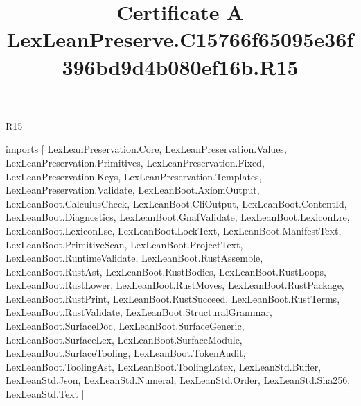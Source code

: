 \begin{lexlean}{R15}
\title{Certificate A LexLeanPreserve.C15766f65095e36f396bd9d4b080ef16b.R15}
\begin{coremodule}
imports [
  LexLeanPreservation.Core,
  LexLeanPreservation.Values,
  LexLeanPreservation.Primitives,
  LexLeanPreservation.Fixed,
  LexLeanPreservation.Keys,
  LexLeanPreservation.Templates,
  LexLeanPreservation.Validate,
  LexLeanBoot.AxiomOutput,
  LexLeanBoot.CalculusCheck,
  LexLeanBoot.CliOutput,
  LexLeanBoot.ContentId,
  LexLeanBoot.Diagnostics,
  LexLeanBoot.GnafValidate,
  LexLeanBoot.LexiconLre,
  LexLeanBoot.LexiconLse,
  LexLeanBoot.LockText,
  LexLeanBoot.ManifestText,
  LexLeanBoot.PrimitiveScan,
  LexLeanBoot.ProjectText,
  LexLeanBoot.RuntimeValidate,
  LexLeanBoot.RustAssemble,
  LexLeanBoot.RustAst,
  LexLeanBoot.RustBodies,
  LexLeanBoot.RustLoops,
  LexLeanBoot.RustLower,
  LexLeanBoot.RustMoves,
  LexLeanBoot.RustPackage,
  LexLeanBoot.RustPrint,
  LexLeanBoot.RustSucceed,
  LexLeanBoot.RustTerms,
  LexLeanBoot.RustValidate,
  LexLeanBoot.StructuralGrammar,
  LexLeanBoot.SurfaceDoc,
  LexLeanBoot.SurfaceGeneric,
  LexLeanBoot.SurfaceLex,
  LexLeanBoot.SurfaceModule,
  LexLeanBoot.SurfaceTooling,
  LexLeanBoot.TokenAudit,
  LexLeanBoot.ToolingAst,
  LexLeanBoot.ToolingLatex,
  LexLeanStd.Buffer,
  LexLeanStd.Json,
  LexLeanStd.Numeral,
  LexLeanStd.Order,
  LexLeanStd.Sha256,
  LexLeanStd.Text
]


\end{coremodule}
\end{lexlean}
